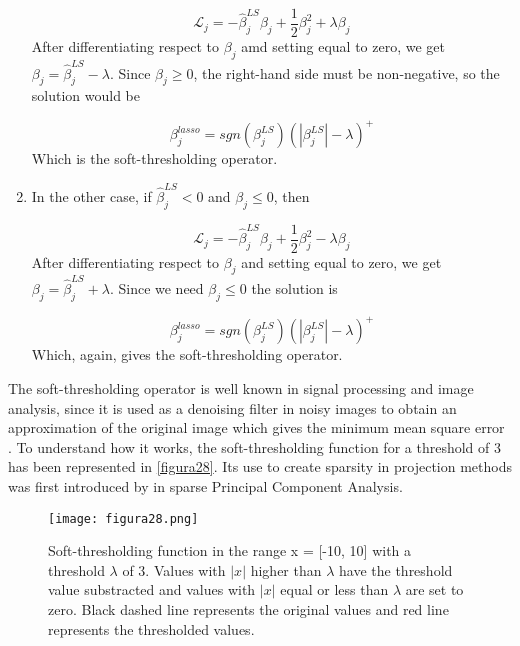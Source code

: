 \begin{enumerate}
    \begin{equation}
        \mathcal{L}_j = -\hat{\beta}^{LS}_j\beta_j+\frac{1}{2}\beta^2_j+\lambda\beta_j
    \end{equation}
    After differentiating respect to $\beta_j$ amd setting equal to zero, we get $\beta_j = \hat{\beta}^{LS}_j-\lambda$. Since $\beta_j \geq 0$, the right-hand side must be non-negative, so the solution would be
    
    \begin{equation}
        \beta_j^{lasso}=sgn(\beta_j^{LS})(|\beta_j^{LS}|-\lambda)^+
    \end{equation}
    Which is the soft-thresholding operator.
    \item In the other case, if $\hat{\beta}^{LS}_j < 0$ and $\beta_j \leq 0$, then
    
    \begin{equation}
        \mathcal{L}_j = -\hat{\beta}^{LS}_j\beta_j+\frac{1}{2}\beta^2_j-\lambda\beta_j
    \end{equation}
    After differentiating respect to $\beta_j$ and setting equal to zero, we get $\beta_j = \hat{\beta}^{LS}_j+\lambda$. Since we need $\beta_j \leq 0$ the solution is
    
    \begin{equation}
        \beta_j^{lasso}=sgn(\beta_j^{LS})(|\beta_j^{LS}|-\lambda)^+
    \end{equation}
    Which, again, gives the soft-thresholding operator.
\end{enumerate}

\vspace{20pt}
The soft-thresholding operator is well known in signal processing and image analysis, since it is used as a denoising filter in noisy images to obtain an approximation of the original image which gives the minimum mean square error \parencite{khare2005soft, joy2013denoising}. To understand how it works, the soft-thresholding function for a threshold of 3 has been represented in \autoref{figura28}. Its use to create sparsity in projection methods was first introduced by \textcite{zou2006sparse} in sparse Principal Component Analysis.
\vspace{10pt}

\begin{figure}[hbtp]
\centering
\texttt{[image: figura28.png]}
\caption{Soft-thresholding function in the range x = [-10, 10] with a threshold $\lambda$ of 3. Values with $|x|$ higher than $\lambda$ have the threshold value substracted and values with $|x|$ equal or less than $\lambda$ are set to zero. Black dashed line represents the original values and red line represents the thresholded values.}
\label{figura28}
\end{figure}

